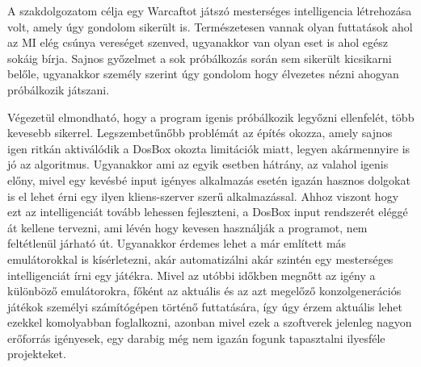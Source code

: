 
A szakdolgozatom célja egy Warcaftot játszó mesterséges intelligencia létrehozása volt, amely úgy gondolom sikerült is. Természetesen vannak olyan futtatások ahol az MI elég csúnya vereséget szenved, ugyanakkor van olyan eset is ahol egész sokáig bírja. Sajnos győzelmet a sok próbálkozás során sem sikerült kicsikarni belőle, ugyanakkor személy szerint úgy gondolom hogy élvezetes nézni ahogyan próbálkozik játszani. 

Végezetül elmondható, hogy a program igenis próbálkozik legyőzni ellenfelét, több kevesebb sikerrel. Legszembetűnőbb problémát az építés okozza, amely sajnos igen ritkán aktiválódik a DosBox okozta limitációk miatt, legyen akármennyire is jó az algoritmus. Ugyanakkor ami az egyik esetben hátrány, az valahol igenis előny, mivel egy kevésbé input igényes alkalmazás esetén igazán hasznos dolgokat is el lehet érni egy ilyen kliens-szerver szerű alkalmazással.
Ahhoz viszont hogy ezt az intelligenciát tovább lehessen fejleszteni, a DosBox input rendszerét eléggé át kellene tervezni, ami lévén hogy kevesen használják a programot, nem feltétlenül járható út. Ugyanakkor érdemes lehet a már említett más emulátorokkal is kísérletezni, akár automatizálni akár szintén egy mesterséges intelligenciát írni egy játékra. Mivel az utóbbi időkben megnőtt az igény a különböző emulátorokra, főként az aktuális és az azt megelőző konzolgenerációs játékok személyi számítógépen történő futtatására, így úgy érzem aktuális lehet ezekkel komolyabban foglalkozni, azonban mivel ezek a szoftverek jelenleg nagyon erőforrás igényesek, egy darabig még nem igazán fogunk tapasztalni ilyesféle projekteket.